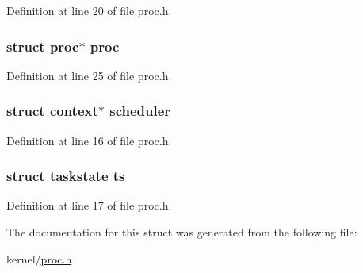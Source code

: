 Definition at line 20 of file proc.\-h.

\hypertarget{structcpu_a333f53825c4bbc35baa89f385e8bafc8}{
\subsubsection[{proc}]{\setlength{\rightskip}{0pt plus 5cm}struct {\bf proc}$\ast$ {\bf proc}}}\label{structcpu_a333f53825c4bbc35baa89f385e8bafc8}


Definition at line 25 of file proc.\-h.

\hypertarget{structcpu_a98d6c9467c7b12be6c9c95a7f2cd76ee}{
\subsubsection[{scheduler}]{\setlength{\rightskip}{0pt plus 5cm}struct {\bf context}$\ast$ scheduler}}\label{structcpu_a98d6c9467c7b12be6c9c95a7f2cd76ee}


Definition at line 16 of file proc.\-h.

\hypertarget{structcpu_a20aef12941acee6e8f1a0693b1fbf681}{
\subsubsection[{ts}]{\setlength{\rightskip}{0pt plus 5cm}struct {\bf taskstate} ts}}\label{structcpu_a20aef12941acee6e8f1a0693b1fbf681}


Definition at line 17 of file proc.\-h.



The documentation for this struct was generated from the following file\-:\begin{DoxyCompactItemize}
\item 
kernel/\hyperlink{proc_8h}{proc.\-h}\end{DoxyCompactItemize}

